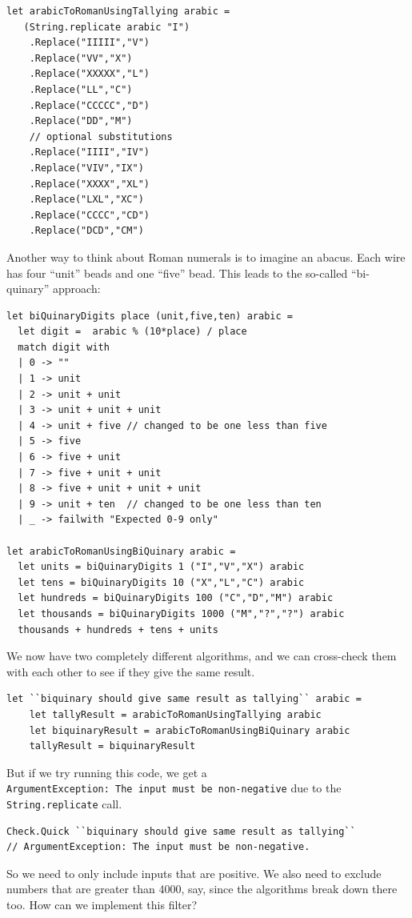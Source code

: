 \begin{verbatim}
let arabicToRomanUsingTallying arabic = 
   (String.replicate arabic "I")
	.Replace("IIIII","V")
	.Replace("VV","X")
	.Replace("XXXXX","L")
	.Replace("LL","C")
	.Replace("CCCCC","D")
	.Replace("DD","M")
	// optional substitutions
	.Replace("IIII","IV")
	.Replace("VIV","IX")
	.Replace("XXXX","XL")
	.Replace("LXL","XC")
	.Replace("CCCC","CD")
	.Replace("DCD","CM")
\end{verbatim}
Another way to think about Roman numerals is to imagine an abacus. Each
wire has four ``unit'' beads and one ``five'' bead.
This leads to the so-called ``bi-quinary'' approach:

\begin{verbatim}
let biQuinaryDigits place (unit,five,ten) arabic =
  let digit =  arabic % (10*place) / place
  match digit with
  | 0 -> ""
  | 1 -> unit
  | 2 -> unit + unit
  | 3 -> unit + unit + unit
  | 4 -> unit + five // changed to be one less than five 
  | 5 -> five
  | 6 -> five + unit
  | 7 -> five + unit + unit
  | 8 -> five + unit + unit + unit
  | 9 -> unit + ten  // changed to be one less than ten
  | _ -> failwith "Expected 0-9 only"

let arabicToRomanUsingBiQuinary arabic = 
  let units = biQuinaryDigits 1 ("I","V","X") arabic
  let tens = biQuinaryDigits 10 ("X","L","C") arabic
  let hundreds = biQuinaryDigits 100 ("C","D","M") arabic
  let thousands = biQuinaryDigits 1000 ("M","?","?") arabic
  thousands + hundreds + tens + units
\end{verbatim}
We now have two completely different algorithms, and we can cross-check
them with each other to see if they give the same result.

\begin{verbatim}
let ``biquinary should give same result as tallying`` arabic = 
	let tallyResult = arabicToRomanUsingTallying arabic 
	let biquinaryResult = arabicToRomanUsingBiQuinary arabic 
	tallyResult = biquinaryResult 
\end{verbatim}
But if we try running this code, we get a
\texttt{ArgumentException:\ The\ input\ must\ be\ non-negative} due to
the \texttt{String.replicate} call.

\begin{verbatim}
Check.Quick ``biquinary should give same result as tallying``
// ArgumentException: The input must be non-negative.
\end{verbatim}
So we need to only include inputs that are positive. We also need to
exclude numbers that are greater than 4000, say, since the algorithms
break down there too.
How can we implement this filter?

